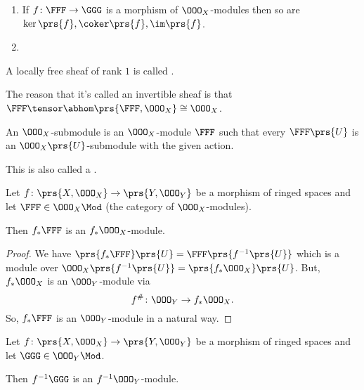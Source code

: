 \documentclass[10pt,a4paper,twoside,openany,hidelinks]{book}
\begin{document}
\begin{fact}
\begin{enumerate}
\item If $f \colon \FFF \to \GGG$ is a morphism of $\OOO_X$-modules then so are $\ker\prs{f}, \coker\prs{f}, \im\prs{f}$.
\item %
\end{enumerate}
\end{fact}



\begin{definition}
A locally free sheaf of rank $1$ is called .
\end{definition}

\begin{remark}
The reason that it's called an invertible sheaf is that $\FFF \tensor \abhom\prs{\FFF,\OOO_X} \cong \OOO_X$.
\end{remark}

\begin{definition}
An $\OOO_X$-submodule is an $\OOO_X$-module $\FFF$ such that every $\FFF\prs{U}$ is an $\OOO_X\prs{U}$-submodule with the given action.

This is also called a .
\end{definition}

\begin{proposition}
Let $f \colon \prs{X, \OOO_X} \to \prs{Y, \OOO_Y}$ be a morphism of ringed spaces and let $\FFF \in \OOO_X\Mod$ (the category of $\OOO_X$-modules).

Then $f_*\FFF$ is an $f_* \OOO_X$-module.
\end{proposition}

\begin{proof}
We have $\prs{f_* \FFF}\prs{U} = \FFF\prs{f^{-1}\prs{U}}$ which is a module over $\OOO_X\prs{f^{-1}\prs{U}} = \prs{f_*\OOO_X}\prs{U}$.
But, $f_* \OOO_X$ is an $\OOO_Y$-module via
\[f^{\#} \colon \OOO_Y \to f_* \OOO_X \text{.}\]
So, $f_* \FFF$ is an $\OOO_Y$-module in a natural way.
\end{proof}

\begin{proposition}
Let $f \colon \prs{X, \OOO_X} \to \prs{Y, \OOO_Y}$ be a morphism of ringed spaces and let $\GGG \in \OOO_Y\Mod$.

Then $f^{-1}\GGG$ is an $f^{-1} \OOO_Y$-module.
\end{proposition}
\end{document}
